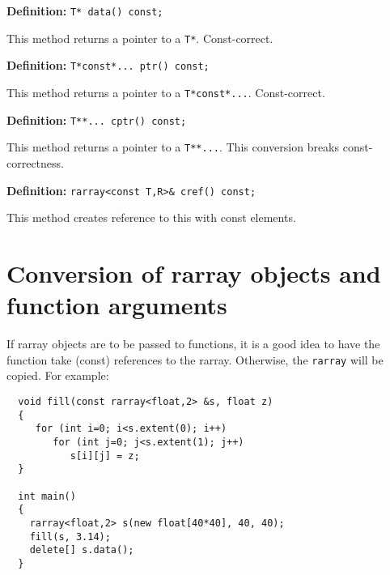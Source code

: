 \documentclass[12pt,twoside]{article}
\begin{document}

\noindent\textbf{Definition:} \texttt{T* data() const;}

This method returns a pointer to a \texttt{T*}. Const-correct.


\noindent\textbf{Definition:} \texttt{T*const*... ptr() const;}

This method returns a pointer to a \texttt{T*const*...}. Const-correct.


\noindent\textbf{Definition:} \texttt{T**... cptr() const;}

This method returns a pointer to a \texttt{T**...}. This conversion breaks const-correctness.%


\noindent\textbf{Definition:} \texttt{rarray{\tt<}const T,R{\tt>}\& cref() const;}

This method creates reference to this with const elements.

\section{Conversion of rarray objects and function arguments}

If rarray objects are to be passed to functions, it is a good idea to have the function take (const) references to the rarray. Otherwise, the \texttt{rarray} will be copied.  For example:
\vspace{-5pt}\begin{framed}\vspace{-14pt}%
\begin{verbatim}
  void fill(const rarray<float,2> &s, float z) 
  {
     for (int i=0; i<s.extent(0); i++)
        for (int j=0; j<s.extent(1); j++)
           s[i][j] = z;
  }

  int main() 
  {
    rarray<float,2> s(new float[40*40], 40, 40);
    fill(s, 3.14);
    delete[] s.data();
  }
\end{verbatim}
\vspace{-14pt}\end{framed}\vspace{-8pt}
\end{document}
